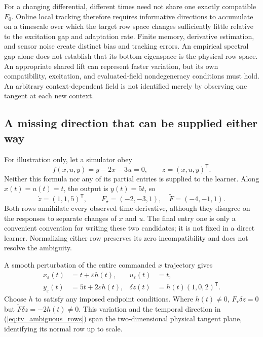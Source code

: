 \documentclass[journal]{IEEEtran}
\begin{document}
For a changing differential, different times need not share one exactly
compatible $F_0$. Online local tracking therefore requires informative
directions to accumulate on a timescale over which the target row space
changes sufficiently little relative to the excitation gap and adaptation
rate. Finite memory, derivative estimation, and sensor noise create distinct
bias and tracking errors. An empirical spectral gap alone does not establish
that its bottom eigenspace is the physical row space. An appropriate shared
lift can represent faster variation, but its own compatibility, excitation,
and evaluated-field nondegeneracy conditions must hold. An arbitrary
context-dependent field is not identified merely by observing one tangent
at each new context.

\subsection{A missing direction that can be supplied either way}
For illustration only, let a simulator obey
\begin{equation}
 f(x,u,y)=y-2x-3u=0,\qquad z=(x,u,y)^{\mathsf T}.
 \label{eq:tv_linear_example}
\end{equation}
Neither this formula nor any of its partial entries is supplied to the
learner. Along $x(t)=u(t)=t$, the output is $y(t)=5t$, so
\begin{equation}
 \dot z=(1,1,5)^{\mathsf T},\qquad
 F_\star=(-2,-3,1),\quad \widetilde F=(-4,-1,1).
 \label{eq:tv_ambiguous_rows}
\end{equation}
Both rows annihilate every observed time derivative, although they disagree
on the responses to separate changes of $x$ and $u$. The final entry one is
only a convenient convention for writing these two candidates; it is not
fixed in a direct learner. Normalizing either row preserves its zero
incompatibility and does not resolve the ambiguity.

A smooth perturbation of the entire commanded $x$ trajectory gives
\begin{equation}
 \begin{aligned}
 x_\varepsilon(t)&=t+\varepsilon h(t),&u_\varepsilon(t)&=t,\\
 y_\varepsilon(t)&=5t+2\varepsilon h(t),&
 \delta z(t)&=h(t)(1,0,2)^{\mathsf T}.
 \end{aligned}
 \label{eq:tv_linear_trial}
\end{equation}
Choose $h$ to satisfy any imposed endpoint conditions. Where $h(t)\ne0$,
$F_\star\delta z=0$ but $\widetilde F\delta z=-2h(t)\ne0$.
This variation and the temporal direction in
(\ref{eq:tv_ambiguous_rows}) span the two-dimensional physical tangent
plane, identifying its normal row up to scale.
\end{document}
